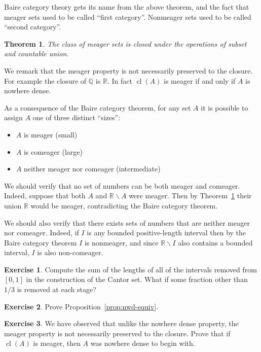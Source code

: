 \documentclass[11pt,oneside,a4paper]{amsbook}
\newcommand{\Q}{\mathbb Q}
\newcommand{\R}{\mathbb R}
\DeclareMathOperator{\cl}{cl}
\theoremstyle{definition}
\newtheorem{exercise}{Exercise}[section]
\theoremstyle{plain}
\newtheorem{theorem}{Theorem}[section]
\theoremstyle{definition}
\theoremstyle{remark}
\numberwithin{equation}{section}
\numberwithin{figure}{section}
\begin{document}
Baire category theory gets its name from the above theorem, and the fact that meager sets used to be called ``first category''. Nonmeager sets used to be called ``second category''.

\begin{theorem}
  \label{thm:meager-pres}
  The class of meager sets is closed under the operations of subset and countable union.
\end{theorem}

We remark that the meager property is not necessarily preserved to the closure. For example the closure of $\Q$ is $\R$. In fact $\cl(A)$ is meager if and only if $A$ is nowhere dense.

As a consequence of the Baire category theorem, for any set $A$ it is possible to assign $A$ one of three distinct ``sizes'':

\begin{itemize}
  \item $A$ is meager (small)
  \item $A$ is comeager (large)
  \item $A$ neither meager nor comeager (intermediate)
\end{itemize}

We should verify that no set of numbers can be both meager and comeager. Indeed, suppose that both $A$ and $\R\smallsetminus A$ were meager. Then by Theorem~\ref{thm:meager-pres} their union $\R$ would be meager, contradicting the Baire category theorem.

We should also verify that there exists sets of numbers that are neither meager nor comeager. Indeed, if $I$ is any bounded positive-length interval then by the Baire category theorem $I$ is nonmeager, and since $\R\smallsetminus I$ also contains a bounded interval, $I$ is also non-comeager.

\begin{exercise}
  \label{exerc:cantor}
  Compute the sum of the lengths of all of the intervals removed from $[0,1]$ in the construction of the Cantor set. What if some fraction other than $1/3$ is removed at each stage?
\end{exercise}

\begin{exercise}
  \label{exerc:nwd-equiv}
  Prove Proposition~\ref{prop:nwd-equiv}.
\end{exercise}

\begin{exercise}
  We have observed that unlike the nowhere dense property, the meager property is not necessarily preserved to the closure. Prove that if $\cl(A)$ is meager, then $A$ was nowhere dense to begin with.
\end{exercise}
\end{document}
